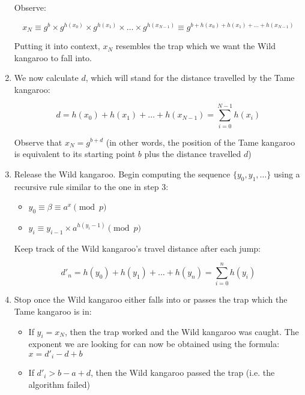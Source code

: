 \documentclass{article}
\begin{document}
\begin{enumerate}
        Observe:

        $$x_N \equiv g^b \times g^{ h(x_0) } \times g^{ h(x_1) } \times \ldots \times g^{ h(x_{N-1}) } \equiv g^{ b + h(x_0) + h(x_1) + \ldots + h(x_{N-1}) }$$

        Putting it into context, $x_N$ resembles the trap which we want the Wild kangaroo to fall into.

        \item We now calculate $d$, which will stand for the distance travelled by the Tame kangaroo:

        $$d = h(x_0) + h(x_1) + \ldots + h(x_{N-1}) = \sum_{i=0}^{N-1} h(x_i)$$

        Observe that $x_N = g^{b+d}$ (in other words, the position of the Tame kangaroo is equivalent to its starting point $b$ plus the distance travelled $d$)

        \item Release the Wild kangaroo. Begin computing the sequence $\{y_0, y_1, \ldots \}$ using a recursive rule similar to the one in step 3:
        \begin{itemize}
            \item $y_0 \equiv \beta \equiv a^x \pmod{p}$
            \item $y_i \equiv y_{i-1} \times a^{h(y_i-1)} \pmod{p}$
        \end{itemize}
        Keep track of the Wild kangaroo's travel distance after each jump:

        $$d'_n = h(y_0) + h(y_1) + \ldots + h(y_n) = \sum_{i=0}^{n} h(y_i)$$

        \item Stop once the Wild kangaroo either falls into or passes the trap which the Tame kangaroo is in:
        \begin{itemize}
            \item If $y_i = x_N$, then the trap worked and the Wild kangaroo was caught. The exponent we are looking for can now be obtained using the formula: $x = d'_i - d + b$

            \item If $d'_i > b - a + d$, then the Wild kangaroo passed the trap (i.e. the algorithm failed)
        \end{itemize}
    \end{enumerate}
\end{document}
